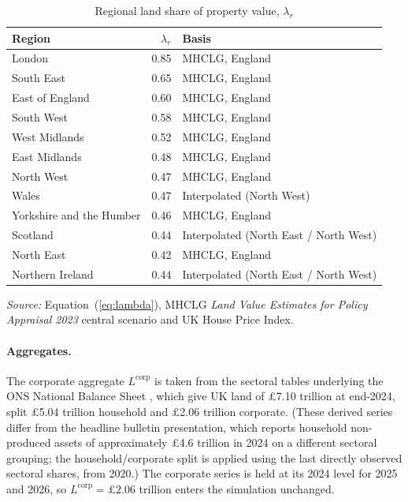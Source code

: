 \begin{table}[htbp]
\centering
\caption{Regional land share of property value, $\lambda_r$}
\label{tab:lambda}
\begin{tabular}{lrl}
\toprule
Region & $\lambda_r$ & Basis \\
\midrule
London              & 0.85 & MHCLG, England \\
South East          & 0.65 & MHCLG, England \\
East of England     & 0.60 & MHCLG, England \\
South West          & 0.58 & MHCLG, England \\
West Midlands       & 0.52 & MHCLG, England \\
East Midlands       & 0.48 & MHCLG, England \\
North West          & 0.47 & MHCLG, England \\
Wales               & 0.47 & Interpolated (North West) \\
Yorkshire and the Humber & 0.46 & MHCLG, England \\
Scotland            & 0.44 & Interpolated (North East / North West) \\
North East          & 0.42 & MHCLG, England \\
Northern Ireland    & 0.44 & Interpolated (North East / North West) \\
\bottomrule
\end{tabular}

\medskip
{\footnotesize\emph{Source:} Equation~(\ref{eq:lambda}), MHCLG \emph{Land Value Estimates for Policy Appraisal 2023} central scenario and UK House Price Index.}
\end{table}

\paragraph{Aggregates.} The corporate aggregate $L^{\mathrm{corp}}$ is taken from the sectoral tables underlying the ONS National Balance Sheet \citep{ons2025}, which give UK land of \pounds 7.10 trillion at end-2024, split \pounds 5.04 trillion household and \pounds 2.06 trillion corporate. (These derived series differ from the headline bulletin presentation, which reports household non-produced assets of approximately \pounds 4.6 trillion in 2024 on a different sectoral grouping; the household/corporate split is applied using the last directly observed sectoral shares, from 2020.) The corporate series is held at its 2024 level for 2025 and 2026, so $L^{\mathrm{corp}} = \pounds 2.06$ trillion enters the simulation unchanged.

